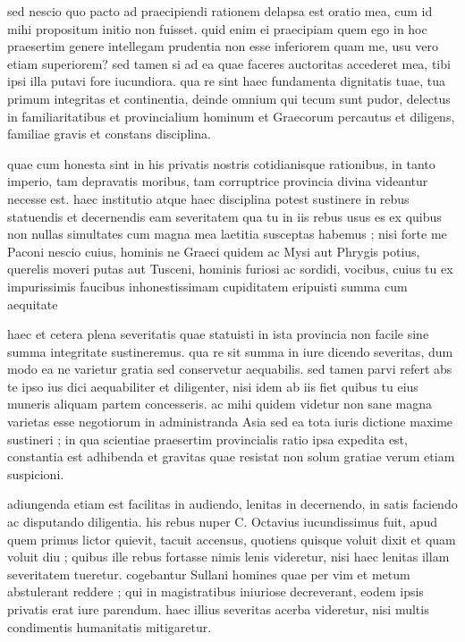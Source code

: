  sed nescio quo pacto ad praecipiendi rationem delapsa est oratio mea, cum id mihi propositum initio non fuisset. quid enim ei praecipiam quem ego in hoc praesertim genere intellegam prudentia non esse inferiorem quam me, usu vero etiam superiorem? sed tamen si ad ea quae faceres auctoritas accederet mea, tibi ipsi illa putavi fore iucundiora. qua re sint haec fundamenta dignitatis tuae, tua primum integritas et continentia, deinde omnium qui tecum sunt pudor, delectus in familiaritatibus et provincialium hominum et Graecorum percautus et diligens, familiae gravis et constans disciplina.

 quae cum honesta sint in his privatis nostris cotidianisque rationibus, in tanto imperio, tam depravatis moribus, tam corruptrice provincia divina videantur necesse est. haec institutio atque haec disciplina potest sustinere in rebus statuendis et decernendis eam severitatem qua tu in iis rebus usus es ex quibus non nullas simultates cum magna mea laetitia susceptas habemus ; nisi forte me Paconi nescio cuius, hominis ne Graeci quidem ac Mysi aut Phrygis potius, querelis moveri putas aut Tusceni, hominis furiosi ac sordidi, vocibus, cuius tu ex impurissimis faucibus inhonestissimam cupiditatem eripuisti summa cum aequitate

 haec et cetera plena severitatis quae statuisti in ista provincia non facile sine summa integritate sustineremus. qua re sit summa in iure dicendo severitas, dum modo ea ne varietur gratia sed conservetur aequabilis. sed tamen parvi refert abs te ipso ius dici aequabiliter et diligenter, nisi idem ab iis fiet quibus tu eius muneris aliquam partem concesseris. ac mihi quidem videtur non sane magna varietas esse negotiorum in administranda Asia sed ea tota iuris dictione maxime sustineri ; in qua scientiae praesertim provincialis ratio ipsa expedita est, constantia est adhibenda et gravitas quae resistat non solum gratiae verum etiam suspicioni.

 adiungenda etiam est facilitas in audiendo, lenitas in decernendo, in satis faciendo ac disputando diligentia. his rebus nuper C. Octavius iucundissimus fuit, apud quem primus lictor quievit, tacuit accensus, quotiens quisque voluit dixit et quam voluit diu ; quibus ille rebus fortasse nimis lenis videretur, nisi haec lenitas illam severitatem tueretur. cogebantur Sullani homines quae per vim et metum abstulerant reddere ; qui in magistratibus iniuriose decreverant, eodem ipsis privatis erat iure parendum. haec illius severitas acerba videretur, nisi multis condimentis humanitatis mitigaretur.


